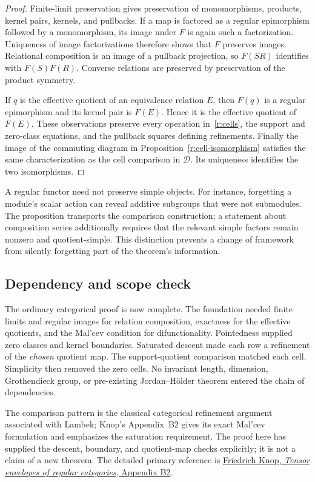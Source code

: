 \documentclass[11pt]{article}
\theoremstyle{definition}
\theoremstyle{remark}\newtheorem{remark}[theorem]{Remark}
\begin{document}
\begin{proof}
Finite-limit preservation gives preservation of monomorphisms, products,
kernel pairs, kernels, and pullbacks.  If a map is factored as a regular
epimorphism followed by a monomorphism, its image under $F$ is again
such a factorization.  Uniqueness of image factorizations therefore shows
that $F$ preserves images.  Relational composition is an image of a
pullback projection, so $F(SR)$ identifies with $F(S)F(R)$.  Converse
relations are preserved by preservation of the product symmetry.

If $q$ is the effective quotient of an equivalence relation $E$, then
$F(q)$ is a regular epimorphism and its kernel pair is $F(E)$.  Hence it
is the effective quotient of $F(E)$.  These observations preserve every
operation in~\eqref{r:cells}, the support and zero-class equations, and
the pullback squares defining refinements.  Finally the image of the
commuting diagram in Proposition~\ref{r:cell-isomorphism} satisfies the
same characterization as the cell comparison in $\mathcal D$.  Its
uniqueness identifies the two isomorphisms.
\end{proof}

A regular functor need not preserve simple objects.  For instance,
forgetting a module's scalar action can reveal additive subgroups that
were not submodules.  The proposition transports the comparison
construction; a statement about composition series additionally requires
that the relevant simple factors remain nonzero and quotient-simple.
This distinction prevents a change of framework from silently forgetting
part of the theorem's information.

\subsection{Dependency and scope check}

The ordinary categorical proof is now complete.  The foundation needed
finite limits and regular images for relation composition, exactness for
the effective quotients, and the Mal'cev condition for difunctionality.
Pointedness supplied zero classes and kernel boundaries.  Saturated
descent made each row a refinement of the \emph{chosen} quotient map.
The support-quotient comparison matched each cell.  Simplicity then
removed the zero cells.  No invariant length, dimension, Grothendieck
group, or pre-existing Jordan--H\"older theorem entered the chain of
dependencies.

The comparison pattern is the classical categorical refinement argument
associated with Lambek; Knop's Appendix~B2 gives its exact Mal'cev
formulation and emphasizes the saturation requirement.  The proof here
has supplied the descent, boundary, and quotient-map checks explicitly;
it is not a claim of a new theorem.  The detailed primary reference is
\href{https://arxiv.org/pdf/math/0610552}{Friedrich Knop, \emph{Tensor
envelopes of regular categories}, Appendix B2}.
\end{document}
